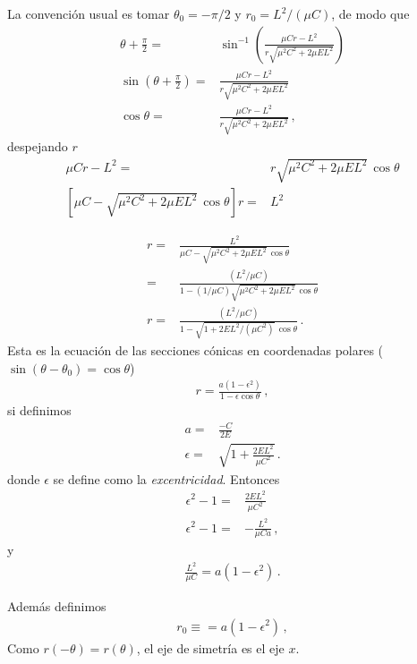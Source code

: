 La convención usual es tomar $\theta_0=-\pi/2$ y $r_0=L^2/(\mu C)$, de modo que 
\begin{align}
  \theta+\frac{\pi}{2}=&\sin^{-1}\left(\frac{\mu C r-L^2}{r\sqrt{\mu^2C^2+2\mu E L^2}}\right)\nonumber\\
  \sin\left(\theta+\frac{\pi}{2}\right)=&\frac{\mu C r-L^2}{r\sqrt{\mu^2C^2+2\mu E L^2}}\nonumber\\
  \cos\theta=&\frac{\mu C r-L^2}{r\sqrt{\mu^2C^2+2\mu E L^2}}\,,
\end{align}
despejando $r$
\begin{align}
  \mu C r-L^2=&r\sqrt{\mu^2C^2+2\mu E L^2}\,\cos\theta\nonumber\\
   \left[\mu C -\sqrt{\mu^2C^2+2\mu E L^2}\,\cos\theta\right]r=& L^2
\end{align}

\begin{align}
   r=&\frac{L^2}{\mu C -\sqrt{\mu^2C^2+2\mu E L^2}\,\cos\theta} \nonumber\\
     =&\frac{(L^2/\mu C)}{1 -(1/\mu C)\sqrt{\mu^2C^2+2\mu E L^2}\,\cos\theta} \nonumber\\
    r =&\frac{(L^2/\mu C)}{1 -\sqrt{1+2EL^2/(\mu C^2)}\,\cos\theta}\,.
\end{align}
Esta es la ecuación de las secciones cónicas en coordenadas polares ($\sin(\theta-\theta_0)=\cos\theta$)
\begin{align}
  \label{eq:11}
  r=\frac{a(1-\epsilon^2)}{1-\epsilon\cos\theta}\,,
\end{align}
si definimos
\begin{align}
  \label{eq:17exc}
  a=&\frac{-C}{2E}\nonumber\\
  \epsilon=&\sqrt{1+\frac{2EL^2}{\mu C^2}}\,.
\end{align}
donde $\epsilon$ se define como la \emph{excentricidad}. Entonces
\begin{align}
  \epsilon^2-1=&\frac{2EL^2}{\mu C^2}\nonumber\\
  \epsilon^2-1=&-\frac{L^2}{\mu C a}\,,
\end{align}
y
\begin{align}
  \frac{L^2}{\mu C}=a(1-\epsilon^2)\,.
\end{align}


Además definimos
\begin{align}
  r_0\equiv=a(1-\epsilon^2)\,,
\end{align}
Como $r(-\theta)=r(\theta)$, el eje de simetría es el eje $x$.

